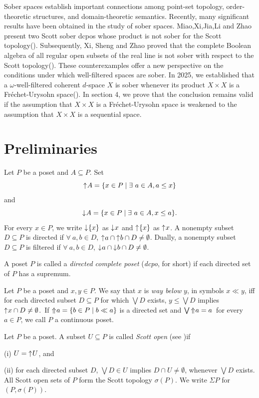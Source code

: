 \documentclass[preprint,12pt]{elsarticle}
\numberwithin{equation}{section}
\newcommand{\dn}{\mathord{\downarrow}\hspace{0.05em}}
\newcommand{\up}{\mathord{\uparrow}\hspace{0.05em}}
\newcommand{\dda}{\mathord{\Uparrow}\hspace{0.05em}}
\begin{document}
Sober spaces establish important connections among point-set topology, order-theoretic structures, and domain-theoretic semantics. Recently, many significant results have been obtained in the study of sober spaces. Miao,Xi,Jia,Li and Zhao present two Scott sober dcpos whose product is not sober for the Scott topology(\cite{EEF31}). Subsequently, Xi, Sheng and Zhao proved that the complete Boolean algebra of all regular open subsets of the real line is not sober with respect to the Scott topology(\cite{EEF32}). These counterexamples offer a new perspective on the conditions under which well-filtered spaces are sober. In 2025, we established that a $\omega$-well-filtered coherent $d$-space $X$ is sober whenever its product $X\times X$ is a Fr\'echet-Urysohn space(\cite{EEF33}). In section 4, we prove that the conclusion remains valid if the assumption that $X\times X$ is a Fr\'echet-Urysohn space is weakened to the assumption that $X\times X$ is a sequential space.

\section{Preliminaries}
\label{}

\quad Let $P$ be a poset and $A\subseteq P$. Set $$\up A=\{x\in P\mid \exists\ a\in A, a\leq x \}$$ and $$\dn A=\{x\in P\mid \exists\ a\in A, x\leq a\}.$$
For every $x\in P$, we write $\dn\{x\}$ as $\dn x$ and $\up\{x\}$ as $\up x$. A nonempty subset $D\subseteq P$ is directed if $\forall\ a,b\in D$, $\up a\cap \up b \cap D\neq\emptyset$. Dually, a nonempty subset $D\subseteq P$ is filtered if $\forall\ a,b\in D$, $\dn a\cap \dn b \cap D\neq\emptyset$.

\quad A poset $P$ is called a {\em directed complete poset} ({\em dcpo}, for short) if each
directed set of $P$ has a supremum.

\quad Let $P$ be a poset and $x, y\in P$. We say that $x$ is {\em way below} $y$, in symbols $x\ll y$, iff for each directed subset $D\subseteq P$ for which $\bigvee D$ exists, $y\leq\bigvee D$ implies $\up x\cap D\neq\emptyset$.\ If $\dda a=\{b\in P\mid b\ll a\}$ is a directed set and $\bigvee \dda a=a$\ for every \ $a\in P$, we call $P$ a continuous poset.

\quad Let $P$ be a poset. A subset $U\subseteq P$ is called {\em Scott open} (see \cite{GG03,JG13})if

 (i) $U=\up U$, and

 (ii) for each directed subset $D$, $\bigvee D\in U$ implies
$D\cap U\neq \emptyset$, whenever $\bigvee D$ exists.\\
All Scott open sets of $P$ form the Scott topology $\sigma(P)$. We write $\Sigma P$ for $(P,\sigma(P))$.
\end{document}
